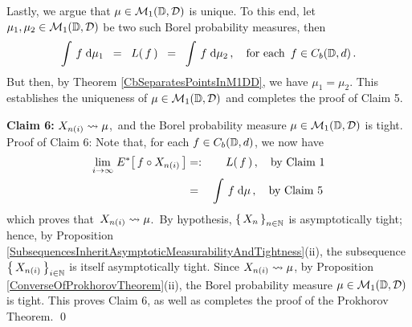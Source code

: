 \vskip 0.3cm
\noindent
Lastly, we argue that $\mu \in \mathcal{M}_{1}(\mathbb{D},\mathcal{D})$ is unique.
To this end, let $\mu_{1}, \mu_{2} \in \mathcal{M}_{1}(\mathbb{D},\mathcal{D})$ be two such
Borel probability measures, then
\begin{equation*}
\int\, f \;\textnormal{d}\mu_{1}
\;\; = \;\;
	L\!\left(\,f\,\right)
\;\; = \;\;
	\int\, f \;\textnormal{d}\mu_{2}\,,
\quad
\textnormal{for each \,$f \in C_{b}(\mathbb{D},d)$}\,.
\end{equation*}
But then, by Theorem \ref{CbSeparatesPointsInM1DD}, we have
$\mu_{1} = \mu_{2}$.
This establishes the uniqueness of
$\mu \in \mathcal{M}_{1}(\mathbb{D},\mathcal{D})$
and completes the proof of Claim 5.

\vskip 0.8cm
\noindent
\textbf{Claim 6:}\;\;
$X_{n(i)} \rightsquigarrow \mu$,\, and
the Borel probability measure $\mu \in \mathcal{M}_{1}(\mathbb{D},\mathcal{D})$ is tight.
\vskip 0.2cm
\noindent
Proof of Claim 6:\;\;
Note that, for each $f \in C_{b}(\mathbb{D},d)$, we now have
\begin{eqnarray*}
\underset{i\rightarrow\infty}{\lim}\; E^{*}\!\left[\,f \circ X_{n(i)}\,\right]
& =: &
	L\!\left(\,f\,\right),
	\quad\textnormal{by Claim 1}
\\
& = &
	\int\, f \;\textnormal{d}\mu\,,
	\quad\textnormal{by Claim 5}\,
\end{eqnarray*}
which proves that \,$X_{n(i)} \rightsquigarrow \mu$.\,
By hypothesis, $\left\{\,X_{n}\,\right\}_{n\in\mathbb{N}}$ is asymptotically tight;
hence, by Proposition \ref{SubsequencesInheritAsymptoticMeasurabilityAndTightness}(ii),
the subsequence $\left\{\,X_{n(i)}\,\right\}_{i\in\mathbb{N}}$ is itself asymptotically tight.
Since $X_{n(i)} \rightsquigarrow \mu$, by Proposition \ref{ConverseOfProkhorovTheorem}(ii),
the Borel probability measure $\mu \in \mathcal{M}_{1}(\mathbb{D},\mathcal{D})$ is tight.
This proves Claim 6, as well as completes the proof of the Prokhorov Theorem.
\qed


